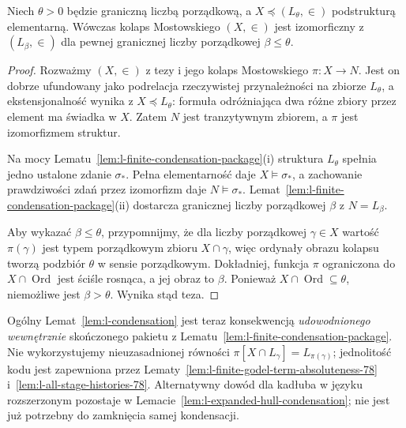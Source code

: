 \begin{lemat}
\label{lem:l-condensation}
Niech $\theta>0$ będzie graniczną liczbą porządkową,
a $X\preccurlyeq(L_\theta,\in)$ podstrukturą elementarną.
Wówczas kolaps Mostowskiego $(X,\in)$ jest izomorficzny
z $(L_\beta,\in)$ dla pewnej granicznej liczby
porządkowej $\beta\le\theta$.
\end{lemat}
\begin{proof}
Rozważmy $(X,\in)$ z tezy i jego kolaps Mostowskiego
$\pi:X\to N$. Jest on dobrze ufundowany jako
podrelacja rzeczywistej przynależności na zbiorze
$L_\theta$, a ekstensjonalność wynika z
$X\preccurlyeq L_\theta$: formuła odróżniająca dwa
różne zbiory przez element ma świadka w $X$.
Zatem $N$ jest tranzytywnym zbiorem, a $\pi$ jest
izomorfizmem struktur.

Na mocy Lematu~\ref{lem:l-finite-condensation-package}(i)
struktura $L_\theta$ spełnia jedno ustalone zdanie
$\sigma_*$. Pełna elementarność daje
$X\models\sigma_*$, a zachowanie prawdziwości zdań
przez izomorfizm daje $N\models\sigma_*$.
Lemat~\ref{lem:l-finite-condensation-package}(ii)
dostarcza granicznej liczby porządkowej $\beta$
z $N=L_\beta$.

Aby wykazać $\beta\leq\theta$, przypomnijmy,
że dla liczby porządkowej $\gamma\in X$ wartość
$\pi(\gamma)$ jest typem porządkowym zbioru
$X\cap\gamma$, więc ordynały obrazu kolapsu
tworzą podzbiór $\theta$ w sensie porządkowym.
Dokładniej, funkcja $\pi$ ograniczona do
$X\cap\operatorname{Ord}$ jest ściśle rosnąca,
a jej obraz to $\beta$. Ponieważ
$X\cap\operatorname{Ord}\subseteq\theta$,
niemożliwe jest $\beta>\theta$.
Wynika stąd teza.
\end{proof}
\begin{uwaga}
\label{rem:lvi-condensation-dependency}
Ogólny Lemat~\ref{lem:l-condensation} jest teraz
konsekwencją \emph{udowodnionego wewnętrznie}
skończonego pakietu z
Lematu~\ref{lem:l-finite-condensation-package}.
Nie wykorzystujemy nieuzasadnionej równości
$\pi[X\cap L_\gamma]=L_{\pi(\gamma)}$;
jednolitość kodu jest zapewniona przez
Lematy~\ref{lem:l-finite-godel-term-absoluteness-78}
i~\ref{lem:l-all-stage-histories-78}.
Alternatywny dowód dla kadłuba w języku
rozszerzonym pozostaje w
Lemacie~\ref{lem:l-expanded-hull-condensation};
nie jest już potrzebny do zamknięcia samej kondensacji.
\end{uwaga}

